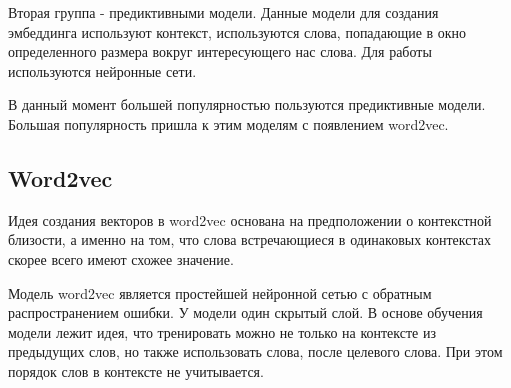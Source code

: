 \documentclass[a4paper,14pt]{article}
\begin{document}

Вторая группа - предиктивными модели.
Данные модели для создания эмбеддинга используют контекст, используются слова, попадающие в окно определенного размера вокруг интересующего нас слова.
Для работы используются нейронные сети.

В данный момент большей популярностью пользуются предиктивные модели.
Большая популярность пришла к этим моделям с появлением word2vec.

\subsection{Word2vec}
	
	Идея создания векторов в word2vec \cite{w2v} основана на предположении о контекстной близости, а именно на том, что слова встречающиеся в одинаковых контекстах скорее всего имеют схожее значение.
	
	Модель word2vec является простейшей нейронной сетью с обратным распространением ошибки.
	У модели один скрытый слой.
	В основе обучения модели лежит идея, что тренировать можно не только на контексте из предыдущих слов, но также использовать слова, после целевого слова.
	При этом порядок слов в контексте не учитывается.

	

\end{document}
